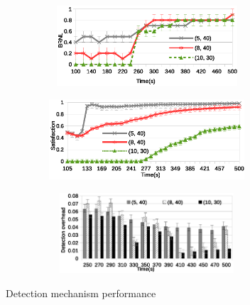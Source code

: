 \begin{figure}[tb]
  \centering
  \begin{subfigure}[c]{0.95\columnwidth}
    \centering
    \includegraphics[width=8.4cm,height=3cm]{./Figures/det-BRNL1.eps}
    \captionsetup{font=ninept}
   \label{subfig:BRNL}
  \end{subfigure}
  \begin{subfigure}[c]{0.95\columnwidth}
    \centering
    \includegraphics[width=8.4cm,height=3cm]{./Figures/det-sat.eps}
    \captionsetup{font=ninept}
     \label{subfig:det-sat}
  \end{subfigure}
  \begin{subfigure}[c]{0.95\columnwidth}
    \centering
    \includegraphics[width=8.4cm,height=3cm]{./Figures/overhead.eps}
    \captionsetup{font=ninept}
    \label{subfig:overhead}
  \end{subfigure}
  \caption{Detection mechanism performance}%
 \label{fig:detection-results}
  \vspace{-4mm}
\end{figure}

